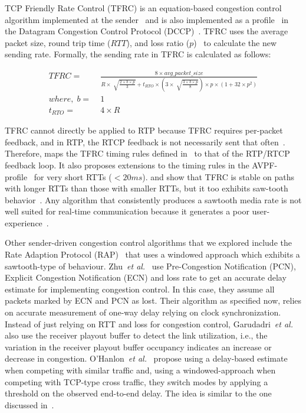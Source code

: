 TCP Friendly Rate Control (TFRC) is an equation-based congestion control
algorithm implemented at the sender~\cite{tfrc_347397} and is also implemented
as a profile~\cite{rfc4342} in the Datagram Congestion Control Protocol
(DCCP)~\cite{rfc4340}. TFRC uses the average packet size, round trip time
($RTT$), and loss ratio ($p$)~\cite{rfc3448} to calculate the new sending rate.
Formally, the sending rate in TFRC is calculated as follows:

\begin{align*}
 TFRC = &\; \frac{8 \times avg\_packet\_size}
{R \times \sqrt[]{\frac{2 \times b \times p}{3}} + t_{RTO} \times 
\left( 3 \times \sqrt[]{\frac{3 \times b \times p}{8}}\right) \times p \times
\left( 1+32 \times p^2 \right)}\\
where,\; b = &\; 1\\
t_{RTO} = &\; 4 \times R
\end{align*}

TFRC cannot directly be applied to RTP because TFRC requires per-packet
feedback, and in RTP, the RTCP feedback is not necessarily sent that
often~\cite{draft.rmcat.feedback}. Therefore, \cite{draft.rtp.tfrc} maps the
TFRC timing rules defined in~\cite{rfc4828, rfc5348} to that of the RTP/RTCP
feedback loop. It also proposes extensions to the timing rules in the
AVPF-profile~\cite{rfc4585} for very short RTTs ($<20ms$).
\cite{Gharai06:ICME} and \cite{VladBalan:2007dq} show that TFRC is stable on
paths with longer RTTs than those with smaller RTTs, but it too exhibits
saw-tooth behavior~\cite{saurin:2006:thesis}. Any algorithm that consistently
produces a sawtooth media rate is not well suited for real-time communication
because it generates a poor user-experience~\cite{Gharai:2002wt,
Zink03subjectiveimpression}.

Other sender-driven congestion control algorithms that we explored include the
Rate Adaption Protocol (RAP)~\cite{rap:752152} that uses a windowed approach which 
exhibits a sawtooth-type of behaviour. Zhu~\textit{et
al.}~\cite{rmcat-nada} use Pre-Congestion Notification (PCN), Explicit
Congestion Notification (ECN) and loss rate to get an accurate delay
estimate for implementing congestion control. In this case, they assume all
packets marked by ECN and PCN as lost. Their algorithm as specified now, 
relies on accurate measurement of one-way delay relying on clock synchronization.
Instead of just relying on RTT and loss for congestion control, 
Garudadri~\textit{et al.}~\cite{4397059} also use the
receiver playout buffer to detect the link utilization, i.e., the variation in the 
receiver playout buffer occupancy indicates an increase or decrease in congestion.
O'Hanlon~\textit{et al.}~\cite{rmcat-dflow} propose using a delay-based
estimate when competing with similar traffic and, using a windowed-approach
when competing with TCP-type cross traffic, they switch modes by applying a
threshold on the observed end-to-end delay. The idea is similar to the one
discussed in~\cite{budzisz2011fair}.




